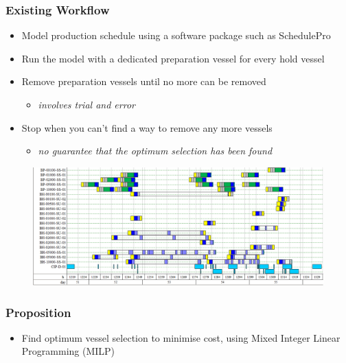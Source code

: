 \documentclass{beamer}
\begin{document}
\begin{frame}
    \frametitle{Existing Workflow}
    \begin{itemize}
        \item Model production schedule using a software package such as
        SchedulePro
        \item Run the model with a dedicated preparation vessel for every hold
        vessel
        \item Remove preparation vessels until no more can be removed
        \begin{itemize}
            \item \emph{involves trial and error}
        \end{itemize}
        \item Stop when you can't find a way to remove any more vessels
        \begin{itemize}
            \item \emph{no guarantee that the optimum selection has been found}
        \end{itemize}
    \end{itemize}
    \begin{figure}
        \centering
        \includegraphics[angle=0,scale=0.2]{schedulepro.png}
    \end{figure}
\end{frame}

\begin{frame}
    \frametitle{Proposition}
    \begin{itemize}
    \item Find optimum vessel selection to minimise cost, using Mixed Integer
    Linear Programming (MILP)
    \end{itemize}
\end{frame}

\end{document}
